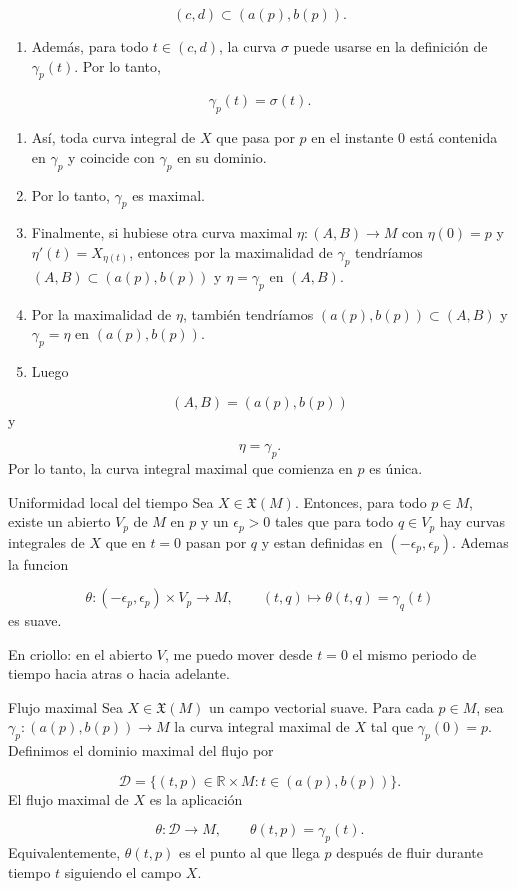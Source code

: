 \begin{bookproof}{}
\[
(c,d)\subset(a(p),b(p)).
\]
\begin{enumerate}[start=32]
\item Además, para todo $t\in(c,d)$, la curva $\sigma$ puede usarse en la definición de $\gamma_p(t)$. Por lo tanto,
\end{enumerate}
\[
\gamma_p(t)=\sigma(t).
\]
\begin{enumerate}[start=33]
\item Así, toda curva integral de $X$ que pasa por $p$ en el instante $0$ está contenida en $\gamma_p$ y coincide con $\gamma_p$ en su dominio.
\item Por lo tanto, $\gamma_p$ es maximal.
\item Finalmente, si hubiese otra curva maximal $\eta:(A,B)\to M$ con $\eta(0)=p$ y $\eta'(t)=X_{\eta(t)}$, entonces por la maximalidad de $\gamma_p$ tendríamos $(A,B)\subset(a(p),b(p))$ y $\eta=\gamma_p$ en $(A,B)$.
\item Por la maximalidad de $\eta$, también tendríamos $(a(p),b(p))\subset(A,B)$ y $\gamma_p=\eta$ en $(a(p),b(p))$.
\item Luego
\end{enumerate}
\[
(A,B)=(a(p),b(p))
\]
y

\[
\eta=\gamma_p.
\]
Por lo tanto, la curva integral maximal que comienza en $p$ es única.

\bookqed
\end{bookproof}
\label{blk:3ff110}
\begin{bookcorollary}{Uniformidad local del tiempo}
Sea $X\in\mathfrak X(M)$. Entonces, para todo $p\in M$, existe un abierto $V_{p}$ de $M$ en $p$ y un $\epsilon_{p}>0$ tales que para todo $q\in V_{p}$ hay curvas integrales de $X$ que en $t=0$ pasan por $q$ y estan definidas en $(-\epsilon_{p},\epsilon_{p})$. Ademas la funcion

\[
\theta:(-\epsilon_{p},\epsilon_{p})\times V_{p}\to M,\qquad (t,q)\mapsto\theta(t,q)=\gamma_q(t)
\]
es suave.

En criollo: en el abierto $V$, me puedo mover desde $t=0$ el mismo periodo de tiempo hacia atras o hacia adelante.

\end{bookcorollary}
\label{blk:3b18e6}
\begin{bookdefinition}{Flujo maximal}
Sea $X\in\mathfrak X(M)$ un campo vectorial suave. Para cada $p\in M$, sea $\gamma_p:(a(p),b(p))\to M$ la curva integral maximal de $X$ tal que $\gamma_p(0)=p$. Definimos el dominio maximal del flujo por

\[
\mathcal D=\{(t,p)\in\mathbb R\times M:t\in(a(p),b(p))\}.
\]
El flujo maximal de $X$ es la aplicación

\[
\theta:\mathcal D\to M,\qquad \theta(t,p)=\gamma_p(t).
\]
Equivalentemente, $\theta(t,p)$ es el punto al que llega $p$ después de fluir durante tiempo $t$ siguiendo el campo $X$.

\end{bookdefinition}
